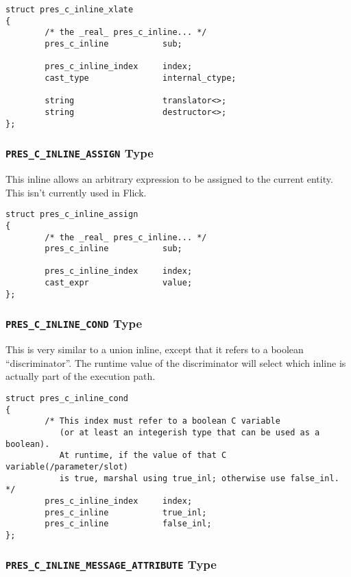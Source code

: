 \begin{verbatim}
struct pres_c_inline_xlate
{
        /* the _real_ pres_c_inline... */
        pres_c_inline           sub;

        pres_c_inline_index     index;
        cast_type               internal_ctype;

        string                  translator<>;
        string                  destructor<>;
};
\end{verbatim}

\subsubsection{\texttt{PRES\_C\_INLINE\_ASSIGN} Type}

This inline allows an arbitrary \CAST{} expression to be assigned to the
current entity.  This isn't currently used in Flick.

\begin{verbatim}
struct pres_c_inline_assign
{
        /* the _real_ pres_c_inline... */
        pres_c_inline           sub;

        pres_c_inline_index     index;
        cast_expr               value;
};
\end{verbatim}

\subsubsection{\texttt{PRES\_C\_INLINE\_COND} Type}

This is very similar to a union inline, except that it refers to a boolean
``discriminator''.  The runtime value of the discriminator will select which
inline is actually part of the execution path.

\begin{verbatim}
struct pres_c_inline_cond
{
        /* This index must refer to a boolean C variable
           (or at least an integerish type that can be used as a boolean).
           At runtime, if the value of that C variable(/parameter/slot)
           is true, marshal using true_inl; otherwise use false_inl.  */
        pres_c_inline_index     index;
        pres_c_inline           true_inl;
        pres_c_inline           false_inl;
};
\end{verbatim}

\subsubsection{\texttt{PRES\_C\_INLINE\_MESSAGE\_ATTRIBUTE} Type}

